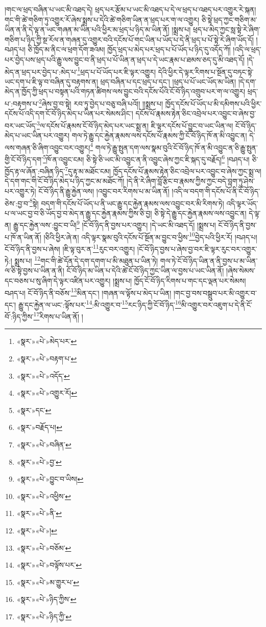 །གང་ལ་ཕྲད་བཞིན་པ་ཡང་མི་འཐད་དེ། ཕྲད་པར་རྩོམ་པ་ཡང་མི་འཐད་པ་དེ་ལ་ཕྲད་པ་འཐད་པར་འགྱུར་རེ་སྐན། གང་གི་ཚེ་གཅིག་ཏུ་འགྱུར་རོ་ཞེས་སྨྲས་པ་དེའི་ཚེ་གཅིག་ཡིན་ན་ཕྲད་པར་ག་ལ་འགྱུར། ཅི་སྟེ་ཕྲད་ཀྱང་གཅིག་མ་ཡིན་ན་ནི་དེ་ལྟ་ན་ཡང་གཞན་མ་ཡིན་པའི་ཕྱིར་མ་ཕྲད་པ་ཉིད་མ་ཡིན་ནོ། །སྨྲས་པ། ཕྲད་པ་མེད་ཀྱང་སླ་སྟེ་རེ་ཞིག་གཅིག་པ་ཉིད་ཀྱི་སྔ་རོལ་ན་གཞན་དུ་འགྱུར་བའི་དངོས་པོ་གང་ཡིན་པ་ཡོད་པ་དེ་ནི་ཕྲད་པ་པོ་སྟེ་རེ་ཞིག་ཡོད་དོ། །བཤད་པ། ཅི་ཁྱོད་མ་ནིང་ལ་ཕྲག་དོག་ཟའམ། ཁྱོད་ཕྲད་པ་མེད་པར་ཕྲད་པ་པོ་ཡོད་པ་ཉིད་དུ་འདོད་ཀོ། །འདི་ལ་ཕྲད་པར་བྱེད་པས་ཕྲད་པའི་རྒྱུ་ལས་བྱུང་བ་ནི་ཕྲད་པ་པོ་ཡིན་ན་ཕྲད་པ་དེ་ཡང་རྣམ་པ་ཐམས་ཅད་དུ་མི་འཐད་དོ། །དེ་མེད་ན་ཕྲད་པར་བྱེད་པ་:མེད་པ་\footnote{«སྣར་»«པེ་»མེད་པར་}ཕྲད་པ་པོ་ཡོད་པར་ཇི་ལྟར་འགྱུར། དེའི་ཕྱིར་དེ་ལྟར་རིགས་པ་སྔོན་དུ་བཏང་སྟེ་ཡང་དག་པ་ཇི་ལྟ་བ་བཞིན་དུ་བརྟགས་ན། ཕྲད་བཞིན་པ་དང་ཕྲད་པ་དང་། །ཕྲད་པ་པོ་ཡང་ཡོད་མ་ཡིན། །དེ་དག་མེད་ན་ཁྱོད་ཀྱི་ཕྲད་པ་བསྟན་པའི་གཏན་ཚིགས་ལས་བྱུང་བའི་དངོས་པོའི་ངོ་བོ་ཉིད་འགྲུབ་པར་ག་ལ་འགྱུར། ཕྲད་པ་:བརྟགས་པ་\footnote{«སྣར་»«པེ་»བརྟག་པ་}ཞེས་བྱ་བ་སྟེ། རབ་ཏུ་བྱེད་པ་བཅུ་བཞི་པའོ།། །།སྨྲས་པ། ཁྱོད་དངོས་པོ་ཡོད་པ་མི་དམིགས་པའི་ཕྱིར་དངོས་པོ་འདི་དག་ངོ་བོ་ཉིད་མེད་པ་ཡིན་པར་སེམས་ཤིང་། དངོས་པོ་རྣམས་རྟེན་ཅིང་འབྲེལ་པར་འབྱུང་བ་ཞེས་བྱ་བར་ཡང་ཡོད་\footnote{«སྣར་»«པེ་»འདོད་}ལ་དངོས་པོ་རྣམས་ངོ་བོ་ཉིད་མེད་པར་ཡང་སྨྲ་ན། ཇི་ལྟར་དངོས་པོ་བྱུང་བ་ཡང་ཡིན་ལ། ངོ་བོ་ཉིད་མེད་པ་ཡང་ཡིན་པར་འགྱུར། གལ་ཏེ་རྒྱུ་དང་རྐྱེན་རྣམས་ལས་དངོས་པོ་རྣམས་ཀྱི་ངོ་བོ་ཉིད་ཁོ་ན་མི་འབྱུང་ན། དེ་ལས་གཞན་ཅི་ཞིག་འབྱུང་བར་འགྱུར།\footnote{«སྣར་»«པེ་»འགྱུར་རོ།} གལ་ཏེ་རྒྱུ་སྤུན་དག་ལས་སྣམ་བུའི་ངོ་བོ་ཉིད་ཁོ་ན་མི་འབྱུང་ན་ཅི་རྒྱུ་སྤུན་གྱི་ངོ་བོ་ཉིད་དག་\footnote{«སྣར་»དང་}ཁོ་ན་འབྱུང་ངམ། ཅི་སྟེ་ཅི་ཡང་མི་འབྱུང་ན་ནི་འབྱུང་ཞེས་ཀྱང་ཇི་སྐད་དུ་བརྗོད།\footnote{«སྣར་»བརྗོད་པ།} །བཤད་པ། ཅི་ཁྱོད་རྟ་ལ་ཞོན་:བཞིན་ཉིད་\footnote{«སྣར་»«པེ་»བཞིན་}དུ་རྟ་མ་མཐོང་ངམ། ཁྱོད་དངོས་པོ་རྣམས་རྟེན་ཅིང་འབྲེལ་པར་འབྱུང་བ་ཞེས་ཀྱང་སྨྲ་ལ། དེ་དག་གང་གི་ངོ་བོ་ཉིད་མེད་པ་ཉིད་ཀྱང་མ་མཐོང་ཀོ། །དེ་ནི་རེ་ཞིག་བློ་རྩིང་བ་རྣམས་ཀྱིས་ཀྱང་བདེ་བླག་ཏུ་ཤེས་པར་འགྱུར་ཏེ། ངོ་བོ་ཉིད་ནི་རྒྱུ་རྐྱེན་ལས། །འབྱུང་བར་རིགས་པ་མ་ཡིན་ནོ། །འདི་ལ་བདག་གི་དངོས་པོ་ནི་ངོ་བོ་ཉིད་ཅེས་:བྱ་བ་\footnote{«སྣར་»«པེ་»བྱ་}སྟེ། བདག་གི་དངོས་པོ་ཡོད་པ་ནི་ཡང་རྒྱུ་དང་རྐྱེན་རྣམས་ལས་འབྱུང་བར་མི་རིགས་ཏེ། འདི་ལྟར་ཡོད་པ་ལ་ཡང་བྱ་བ་ཅི་ཡོད་བྱ་བ་མེད་ན་རྒྱུ་དང་རྐྱེན་རྣམས་ཀྱིས་ཅི་བྱ། ཅི་སྟེ་དེ་རྒྱུ་དང་རྐྱེན་རྣམས་ལས་འབྱུང་ན། དེ་ལྟ་ན། རྒྱུ་དང་རྐྱེན་ལས་:བྱུང་བ་ཡི།\footnote{«སྣར་»«པེ་»བྱུང་བ་ཡིས།} །ངོ་བོ་ཉིད་ནི་བྱས་པར་འགྱུར། །དེ་ཡང་མི་འཐད་དོ། །སྨྲས་པ། ངོ་བོ་ཉིད་ནི་བྱས་པ་ཁོ་ན་ཡིན་ནོ། །ཅིའི་ཕྱིར་ཞེ་ན། འདི་ལྟར་སྣམ་བུའི་དངོས་པོ་སྔོན་མ་བྱུང་བ་ཕྱིས་\footnote{«སྣར་»«པེ་»འཕྱིས་}བྱེད་པའི་ཕྱིར་རོ། །བཤད་པ། ངོ་བོ་ཉིད་ནི་བྱས་པ་ཞེས། །ཇི་ལྟ་བུར་ན་\footnote{«སྣར་»«པེ་»ནི་}རུང་བར་འགྱུར། །ངོ་བོ་ཉིད་བྱས་པ་ཞེས་བྱ་བར་ཇི་ལྟར་རུང་བར་འགྱུར་ཏེ:། སྨྲས་པ། \footnote{«སྣར་»«པེ་»།  }གང་གི་ཚེ་དོན་དེ་དག་དགག་པ་མི་མཐུན་པ་ཡིན་ཏེ། གལ་ཏེ་ངོ་བོ་ཉིད་ཡིན་ན་ནི་བྱས་པ་མ་ཡིན་ལ་ཅི་སྟེ་བྱས་པ་ཡིན་ན་ནི། ངོ་བོ་ཉིད་མ་ཡིན་པ་དེའི་ཚེ་ངོ་བོ་ཉིད་ཀྱང་ཡིན་ལ་བྱས་པ་ཡང་ཡིན་ནོ། །ཞེས་སེམས་དང་བཅས་པ་སུ་ཞིག་དེ་ལྟར་འཛིན་པར་འགྱུར། །སྨྲས་པ། ཁྱོད་ངོ་བོ་ཉིད་རིགས་པ་གང་དང་ལྡན་པར་སེམས། བཤད་པ། ངོ་བོ་ཉིད་ནི་བཅོས་\footnote{«སྣར་»«པེ་»བཅོམ་}མིན་དང་། །གཞན་ལ་ལྟོས་པ་མེད་པ་ཡིན། །གང་བྱ་བས་བསྒྲུབ་པར་མི་འགྱུར་བ་དང་། རྒྱུ་དང་རྐྱེན་ལ་ཡང་:ལྟོས་པར་\footnote{«སྣར་»«པེ་»བལྟོས་པར་}:མི་འགྱུར་བ་\footnote{«སྣར་»«པེ་»མ་གྱུར་པ་}རང་ཉིད་ཀྱི་ངོ་བོ་ཉིད་\footnote{«སྣར་»«པེ་»ཉིད་ཀྱིས་}མི་འགྱུར་བར་འཇུག་པ་དེ་ནི་ངོ་བོ་:ཉིད་ཀྱིས་\footnote{«སྣར་»«པེ་»ཉིད་ཀྱི་}རིགས་པ་ཡིན་ནོ། །
